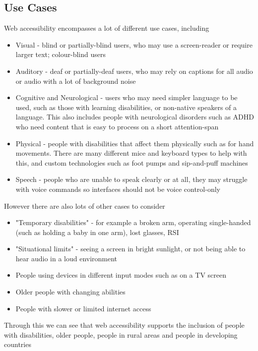 \documentclass[ %
                    author={Aleena Baig},
                supervisor={Dr Simon Lock},
                    degree={BSc},
                     title={On Making Web Accessible Graphs},
                  subtitle={},
                      year={2019} ]{dissertation}
\begin{document}
\subsection{Use Cases}

Web accessibility encompasses a lot of different use cases, including

\begin{itemize}
    \item Visual - blind or partially-blind users, who may use a screen-reader or require larger text; colour-blind users
    \item Auditory - deaf or partially-deaf users, who may rely on captions for all audio or audio with a lot of background noise
    \item Cognitive and Neurological - users who may need simpler language to be used, such as those with learning disabilities, or non-native speakers of a language. This also includes people with neurological disorders such as ADHD who need content that is easy to process on a short attention-span
    \item Physical - people with disabilities that affect them physically such as for hand movements. There are many different mice and keyboard types to help with this, and custom technologies such as foot pumps and sip-and-puff machines
    \item Speech - people who are unable to speak clearly or at all, they may struggle with voice commands so interfaces should not be voice control-only
\end{itemize}


However there are also lots of other cases to consider \cite{WAIaccessibilityintro}
%
\begin{itemize}
    \item "Temporary disabilities" - for example a broken arm, operating single-handed (such as holding a baby in one arm), lost glasses, RSI
    \item "Situational limits" - seeing a screen in bright sunlight, or not being able to hear audio in a loud environment
    \item People using devices in different input modes such as on a TV screen
    \item Older people with changing abilities
    \item People with slower or limited internet access
\end{itemize}

Through this we can see that web accessibility supports the inclusion of people with disabilities, older people, people in rural areas and people in developing countries
\end{document}
